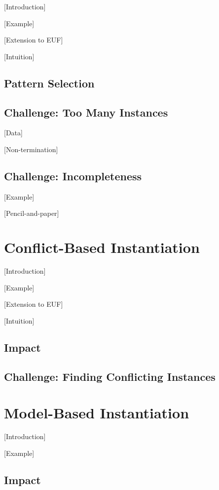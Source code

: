 \documentclass[oribibl]{llncs}
\begin{document}
[Introduction]

[Example]

[Extension to EUF]

[Intuition]

\subsection{Pattern Selection}

\subsection{Challenge: Too Many Instances}

[Data]

[Non-termination]

\subsection{Challenge: Incompleteness}

[Example]

[Pencil-and-paper]

\section{Conflict-Based Instantiation}

[Introduction]

[Example]

[Extension to EUF]

[Intuition]

\subsection{Impact}

\subsection{Challenge: Finding Conflicting Instances}

\section{Model-Based Instantiation}

[Introduction]

[Example]

\subsection{Impact}
\end{document}
